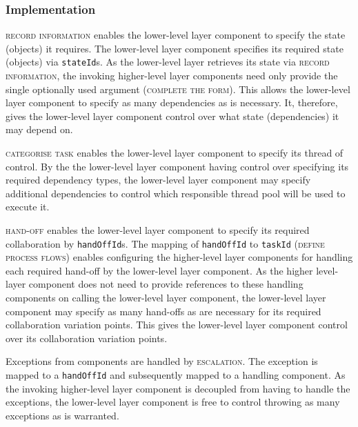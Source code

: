 \documentclass[prodmode]{style/acmlarge}
\begin{document}
\subsubsection*{Implementation}

\textsc{record information} enables the lower-level layer component to specify
the state (objects) it requires.  The lower-level layer component specifies its
required state (objects) via \texttt{stateId}s.  As the lower-level layer
retrieves its state via \textsc{record information}, the invoking higher-level
layer components need only provide the single optionally used argument
(\textsc{complete the form}).  This allows the lower-level layer component to
specify as many dependencies as is necessary.  It, therefore, gives the
lower-level layer component control over what state (dependencies) it
may depend on.

\textsc{categorise task} enables the lower-level layer component to specify its
thread of control.  By the the lower-level layer component having control over
specifying its required dependency types, the lower-level layer component may
specify additional dependencies to control which responsible thread pool will be
used to execute it.

\textsc{hand-off} enables the lower-level layer component to specify its
required collaboration by \texttt{handOffId}s.  The mapping of
\texttt{handOffId} to \texttt{taskId} (\textsc{define process flows}) enables
configuring the higher-level layer components for handling each required
hand-off by the lower-level layer component.  As the higher level-layer
component does not need to provide references to these handling components on
calling the lower-level layer component, the lower-level layer component may
specify as many hand-offs as are necessary for its required collaboration
variation points.  This gives the lower-level layer component control over its
collaboration variation points.

Exceptions from components are handled by \textsc{escalation}.  The
exception is mapped to a \texttt{handOffId} and subsequently mapped to a
handling component.  As the invoking higher-level layer component is decoupled
from having to handle the exceptions, the lower-level layer component is free to
control throwing as many exceptions as is warranted.
\end{document}
